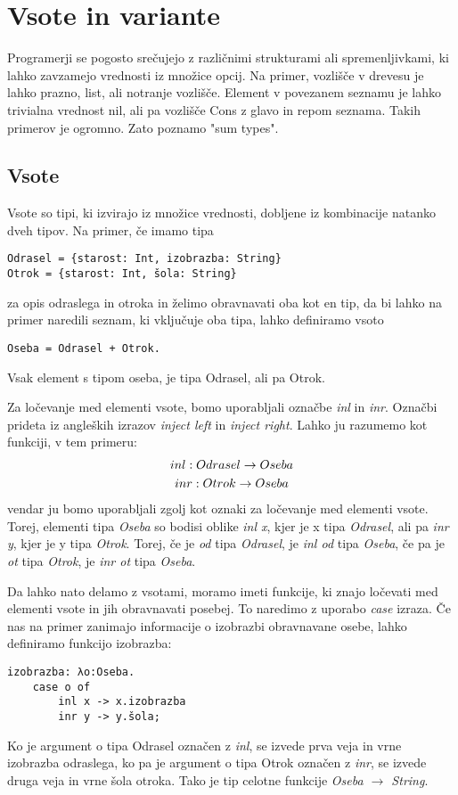 \documentclass[12pt,a4paper,openany]{book}
\begin{document}
\chapter{Vsote in variante}
Programerji se pogosto srečujejo z različnimi strukturami ali spremenljivkami, ki lahko zavzamejo vrednosti iz množice opcij. Na primer, vozlišče v drevesu je lahko prazno, list, ali 
notranje vozlišče. Element v povezanem seznamu je lahko trivialna vrednost nil, ali pa vozlišče Cons z glavo in repom seznama. Takih primerov je ogromno. Zato poznamo "sum types".

\section{Vsote}
Vsote so tipi, ki izvirajo iz množice vrednosti, dobljene iz kombinacije natanko dveh tipov. Na primer, če imamo tipa
\begin{lstlisting}
Odrasel = {starost: Int, izobrazba: String}
Otrok = {starost: Int, šola: String}
\end{lstlisting}
za opis odraslega in otroka in želimo obravnavati oba kot en tip, da bi lahko na primer naredili seznam, ki vključuje oba tipa, lahko definiramo vsoto
\begin{lstlisting}
Oseba = Odrasel + Otrok.
\end{lstlisting}
Vsak element s tipom oseba, je tipa Odrasel, ali pa Otrok.

Za ločevanje med elementi vsote, bomo uporabljali označbe \emph{inl} in \emph{inr}. Označbi prideta iz angleških izrazov \textit{inject left} in \textit{inject right}. Lahko ju razumemo kot
funkciji, v tem primeru:
\begin{gather}
    inl: Odrasel \rightarrow Oseba \notag\\
    inr: Otrok \rightarrow Oseba \notag
\end{gather}
vendar ju bomo uporabljali zgolj kot oznaki za ločevanje med elementi vsote. Torej, elementi tipa \emph{Oseba} so bodisi oblike \emph{inl x}, kjer je x tipa \emph{Odrasel}, ali pa \emph{inr y}, kjer je y 
tipa \emph{Otrok}. Torej, če je \emph{od} tipa \emph{Odrasel}, je \emph{inl od} tipa \emph{Oseba}, če pa je \emph{ot} tipa \emph{Otrok}, je \emph{inr ot} tipa \emph{Oseba}.

Da lahko nato delamo z vsotami, moramo imeti funkcije, ki znajo ločevati med elementi vsote in jih obravnavati posebej. To naredimo z uporabo \emph{case} izraza. Če nas na primer zanimajo 
informacije o izobrazbi obravnavane osebe, lahko definiramo funkcijo izobrazba:
\begin{lstlisting}
izobrazba: λo:Oseba.
    case o of
        inl x -> x.izobrazba
        inr y -> y.šola;
\end{lstlisting}
Ko je argument o tipa Odrasel označen z \emph{inl}, se izvede prva veja in vrne izobrazba odraslega, ko pa je argument o tipa Otrok označen z \emph{inr}, se izvede druga veja in vrne šola
otroka. Tako je tip celotne funkcije \emph{Oseba $\rightarrow$ String}.
\end{document}
